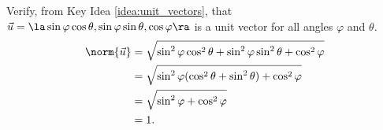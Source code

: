 {Verify, from Key Idea \ref{idea:unit_vectors}, that $\vec u=\la \sin\varphi\cos\theta,\sin\varphi\sin\theta,\cos\varphi\ra$ is a unit vector for all angles $\varphi$ and $\theta$.
}
{\begin{align*}
\norm{\vec u} &= \sqrt{\sin^2\varphi\cos^2\theta+\sin^2\varphi\sin^2\theta+\cos^2\varphi}\\
						&= \sqrt{\sin^2\varphi(\cos^2\theta+\sin^2\theta)+\cos^2\varphi}\\
						&= \sqrt{\sin^2\varphi+\cos^2\varphi}\\
						&=1.
\end{align*}
}
